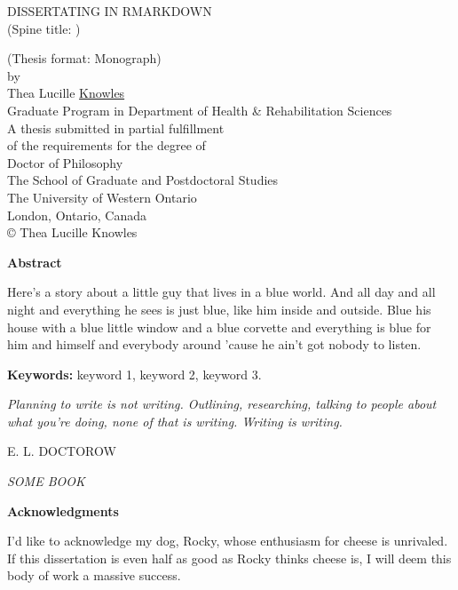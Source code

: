 \documentclass[
  12pt,
  oneside]{book}
\date{}
\makeatletter
\newlength\longest
\numberwithin{figure}{chapter}
\newenvironment{preliminary}%
{\pagestyle{plain}\pagenumbering{roman}}%
{\pagenumbering{arabic}}
\newcommand\isco[1]{%
  \edef\@tempa{#1}%
  \def\@tempb{}%
  \ifx\@tempa\@tempb
	\else \\\underline{Co-Supervisor:}\vspace{0.35in}\\\dots\dots\dots\dots\dots\dots\dots\\{#1}\\
  \fi
}
\newcommand\isjoint[1]{%
  \edef\@tempa{#1}%
  \def\@tempb{}%
  \ifx\@tempa\@tempb
	\else \\\underline{Joint Supervisor:}\vspace{0.35in}\\\dots\dots\dots\dots\dots\dots\dots\\{#1}\\
  \fi
}
\newcommand\isalt[1]{%
  \edef\@tempa{#1}%
  \def\@tempb{}%
  \ifx\@tempa\@tempb
	\else \\\underline{Alternate Supervisor:}\vspace{0.35in}\\\dots\dots\dots\dots\dots\dots\dots\\{#1}\\
  \fi
}
\newcommand\isdefinedsig[1]{%
  \edef\@tempa{#1}%
  \def\@tempb{}%
  \ifx\@tempa\@tempb
	\else \\ \dots\dots\dots\dots\dots\dots\dots\\{#1}\\
  \fi
}
\newcommand\isdefinedspinetitle[1]{%
  \edef\@tempa{#1}%
  \def\@tempb{}%
  \ifx\@tempa\@tempb
	\else (Spine title: #1)\\
  \fi
}
\newcommand\coauthor[1]{%
  \edef\@tempa{#1}%
  \def\@tempb{}%
  \ifx\@tempa\@tempb
	\else \newpage \Large Co-Authorship Statement\normalsize\\\indent\\#1\\
  \fi
}
\newcommand\acknowlege[1]{%
  \edef\@tempa{#1}%
  \def\@tempb{}%
  \ifx\@tempa\@tempb
	\else \newpage \Large Acknowledgements\normalsize\\\indent\\#1\newpage
  \fi
}
\newcommand{\super}{Dr. Supervisor} %
\newcommand{\superc}{} %
\newcommand{\supera}{} %
\newcommand{\scob}{Dr. Committee Member 1}  %
\newcommand{\scoc}{Dr. Committee Member 2}  %
\newcommand{\sct}{}  %
\newcommand{\examo}{Dr. Examiner 1}  %
\newcommand{\examt}{Dr. Examiner 2}
\newcommand{\examth}{Dr. Examiner 3}
\newcommand{\examf}{Dr. Examiner 4}
\newcommand{\department}{Department of Health \& Rehabilitation Sciences}
\newcommand{\degree}{Doctor of Philosophy}
\newcommand{\firstname}{Thea}
\newcommand{\middlename}{Lucille}
\newcommand{\lastname}{Knowles}
\newcommand{\authorname}{{\firstname} {\middlename} {\lastname}}
\newcommand{\titl}{Dissertating in RMarkdown}
\newcommand{\spinetitle}{}%
\newcommand{\thesisformat}{Monograph} %
\newcommand{\gyear}{\number\year}
\newcommand{\makecoauthor}{}
\newcommand{\makeacknowlege} {
}
\renewcommand{\maketitle}
{\begin{titlepage}
   \setcounter{page}{1}
   \begin{large}
   \begin{center}
      \mbox{}
      \vfill
      {\MakeUppercase{\titl}}\\
      \isdefinedspinetitle{\spinetitle}
      (Thesis format: \thesisformat)\\
      \vfill
      by \\
      \vfill
      {\firstname{} \middlename } \underline{\lastname}\\
      \vfill
      Graduate Program in {\department}\\
      \vfill
		A thesis submitted in partial fulfillment\\
		of the requirements for the degree of\\
		\degree\\
		\vfill
		The School of Graduate and Postdoctoral Studies\\
		The University of Western Ontario\\
		London, Ontario, Canada\\
		\vfill
      {\copyright} {\authorname} {\gyear}  \\
      \vspace*{.2in}
   \end{center}
   \end{large}
   \end{titlepage}

}%
\newcommand{\makecert}{
   \setcounter{page}{2}
\vfill
\begin{center}
\large
WESTERN UNIVERSITY\\
School of Graduate and Postdoctoral Studies\\
\vfill
\textbf{CERTIFICATE OF EXAMINATION}
\end{center}

\vfill
\begin{table}[ht]
\begin{minipage}[t]{0.5\linewidth} %
\begin{tabular}{l}
\underline{Supervisor:}\vspace{0.35in}
\isdefinedsig{\super}
\isco{\superc}
\isjoint{\superj}
\isalt{\supera}
\\
\end{tabular}
\vfill
\end{minipage}
\hspace{0.5in}
\begin{minipage}[t]{0.5\linewidth}
\begin{tabular}{l}
\underline{Examiners:} \\\vspace{.5cm}
\isdefinedsig{\examo}\\
\isdefinedsig{\examt}\\
\isdefinedsig{\examth}\\
\isdefinedsig{\examf}
\end{tabular}
\vfill
\end{minipage}
\vfill
\end{table}
\vfill
\begin{center}
The thesis by \\ \vfill
\textbf{\firstname{} \middlename{} \underline{\lastname}}\\
\vfill
entitled:\\\vfill
\textbf{\titl}\\\vfill
is accepted in partial fulfillment of the \\
requirements for the degree of\\
\degree\\
\end{center}
\begin{table}[ht]
\begin{minipage}[t]{0.5\linewidth}
\begin{tabular}{l}
\dots\dots\dots\dots\dots\\
Date
\end{tabular}
\end{minipage}
\hspace{0.5in}
\begin{minipage}[t]{0.5\linewidth}
\begin{tabular}{l}
\dots\dots\dots\dots\dots\dots\dots\dots\dots\dots\\
Chair of the Thesis Examination Board
\end{tabular}
\end{minipage}
\end{table}

}
\makeatother
\begin{document}
\frontmatter


\begin{preliminary}

\maketitle
\newpage


\setcounter{page}{2}
\Large\begin{center}\textbf{Abstract}\end{center}\normalsize
%

Here's a story 
about a little guy that lives in a blue world. 
And all day and all night and everything he sees is just blue, 
like him inside and outside. 
Blue his house with a blue little window 
and a blue corvette 
and everything is blue for him 
and himself and everybody around 
'cause he ain't got nobody to listen.

\vfill
\noindent\textbf{Keywords:} keyword 1, keyword 2, keyword 3.
\newpage




\clearpage

\thispagestyle{empty}
\null\vfill
{
	\settowidth{}
	\centering
	\hspace{3cm}\parbox{\longest}{%
		\raggedright{\Large\itshape%
      Planning to write is not writing. Outlining, researching, talking to people about what you're doing, none of that is writing. Writing is writing.\par\bigskip
		}   
		\raggedleft\MakeUppercase{E. L. Doctorow}\par%
		\raggedleft\MakeUppercase{\textit{Some book}}\par%
}}

\vfill\vfill

\newpage


\Large\begin{center}\textbf{Acknowledgments}\end{center}\normalsize
%
I'd like to acknowledge my dog, Rocky, whose enthusiasm for cheese is unrivaled. If this dissertation is even half as good as Rocky thinks cheese is, I will deem this body of work a massive success.


\end{preliminary}
\end{document}
